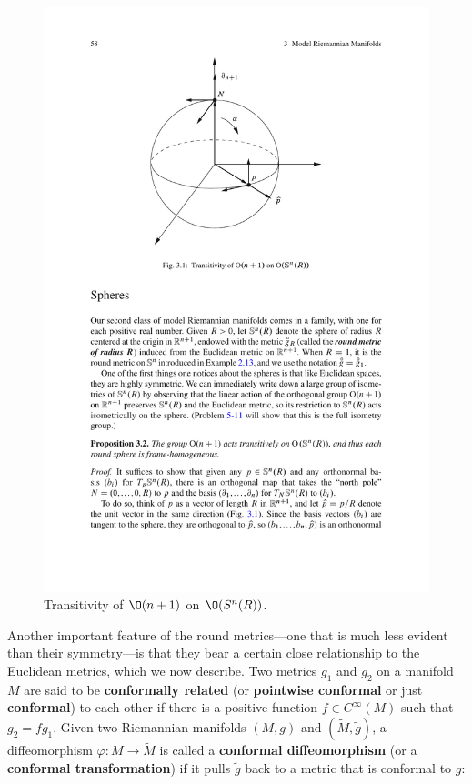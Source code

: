\begin{figure}[htbp]
\centering
\includegraphics{pictures/sphere-homogeneous}
\caption{Transitivity of $\O(n+1)$ on $\O(S^n(R))$.}
\end{figure}
Another important feature of the round metrics---one that is much less evident than their 
symmetry---is that they bear a certain close relationship to the Euclidean metrics, which we now 
describe. Two metrics $g_1$ and $g_2$ on a manifold $M$ are said to be \textbf{conformally related} (or \textbf{pointwise conformal} or just \textbf{conformal}) to each other if there is a positive function $f\in C^\infty(M)$ such that $g_2=fg_1$. Given two Riemannian manifolds $(M,g)$ and $(\widetilde{M},\tilde{g})$, a diffeomorphism $\varphi:M\to\widetilde{M}$ is called a \textbf{conformal diffeomorphism} (or a \textbf{conformal transformation}) if it pulls $\tilde{g}$ back to a metric that is conformal to $g$:

